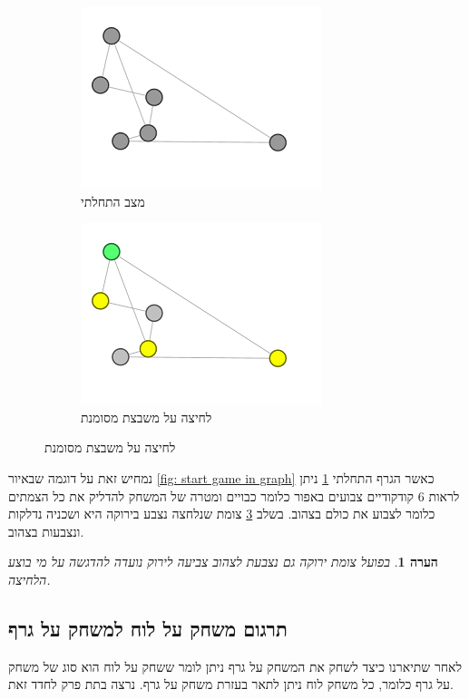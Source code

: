 \documentclass[12pt,leqno]{article}
\theoremstyle{theoremdd}
\newtheorem{comm}{הערה}[section]
\begin{document}
\begin{figure}[ht]
    \caption{משחק על גרף לדוגמה}
    \label{fig: start game in graph}
    \begin{subfigure}{.5\textwidth}
        \centering
        \caption{מצב התחלתי}
        \label{subfig: graph game start}
        \includegraphics[scale=0.7]{images/graph_start_board.png}
    \end{subfigure}%
    \begin{subfigure}{.5\textwidth}
        \centering
        \caption{לחיצה על משבצת מסומנת}
        \label{subfig: graph game move}
        \includegraphics[scale=0.7]{images/graph_press.png}
    \end{subfigure}%
\end{figure}

נמחיש זאת על דוגמה שבאיור
\ref{fig: start game in graph}
כאשר הגרף התחלתי
\ref{subfig: graph game start}
ניתן לראות
$6$
קודקודיים
צבועים באפור כלומר כבויים ומטרה של המשחק להדליק את כל הצמתים כלומר לצבוע את כולם בצהוב.
בשלב 
\ref{subfig: graph game move}
צומת שנלחצה נצבע בירוקה היא ושכניה נדלקות ונצבעות בצהוב.

\begin{comm}
    בפועל צומת ירוקה גם נצבעת לצהוב צביעה לירוק נועדה להדגשה על מי בוצע הלחיצה.
\end{comm}

\subsection{תרגום משחק על לוח למשחק על גרף}
לאחר שתיארנו כיצד לשחק את המשחק על גרף ניתן לומר ששחק על לוח
הוא סוג של משחק על גרף
כלומר, כל משחק 
לוח ניתן לתאר בעזרת משחק על גרף.
נרצה בתת פרק לחדד זאת.
\end{document}
